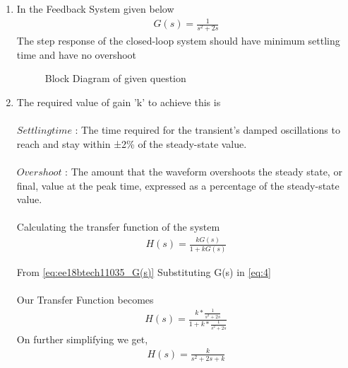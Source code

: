 \begin{enumerate}[label=\thesection.\arabic*.,ref=\thesection.\theenumi]

\item
In the Feedback System given below 
\begin{align}
\label{eq:ee18btech11035_G(s)}
 G(s)=\frac{1}{s^2+2s}
\end{align}
The step response of the closed-loop system should have minimum settling time and have no overshoot\\

\begin{figure}[!ht]
    \begin{center}
		
		\resizebox{\columnwidth}{!}{}
	\end{center}
\caption{Block Diagram of given question}
\label{fig:block2}
\end{figure}

\item The required value of gain 'k' to achieve this is\\
\solution \\$Settling time$ : The time required for the transient's damped oscillations to
reach and stay within ±2\% of the steady-state value.\\
\\$Overshoot$ : The amount that the waveform overshoots the steady state, or final, value at the peak time, expressed as a percentage of the steady-state
value.\\
\\
Calculating the transfer function of the system\\
\begin{align}
H(s) = \frac{kG(s)}{1+kG(s)}
\label{eq:4}
\end{align}

From \eqref{eq:ee18btech11035_G(s)} Substituting G(s) in \eqref{eq:4} \\
\\Our Transfer Function becomes 
\begin{align}
H(s) = \frac{k*\frac{1}{s^2+2s}}{1+k*\frac{1}{s^2+2s}}
\end{align}
On further simplifying we get,\\
\begin{align}
H(s) = \frac{k}{s^2+2s+k}
\label{eq:H(s)}
\end{align}\\


\end{enumerate}
